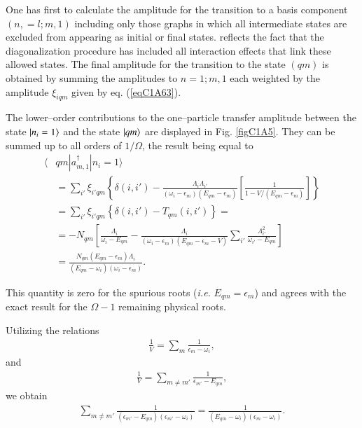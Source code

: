 One has first to calculate the amplitude for the transition to a basis component $(n, = l; m, 1)$ including only those graphs in which all intermediate states are excluded from appearing as initial or final states. reflects the fact that the diagonalization procedure has included all interaction effects that link these allowed states. The final amplitude for the transition to the state $(qm)$ is obtained by summing the amplitudes to $n=1;m,1$ each weighted by the amplitude $\xi_{iqm}$ given by eq. (\ref{eqC1A63}). 

The lower--order contributions to the one--particle transfer amplitude between the state $|{n_i=1} \rangle$ and the state $|{qm} \rangle$ are displayed in Fig. \ref{figC1A5}. They can be summed up to all orders of $1/\Omega$, the result being equal to 
  \begin{align}\label{eqC1A73} 
   \nonumber \langle & qm|a^\dagger_{m,1}|n_i=1\rangle\\
\nonumber &=\sum_{i'}\xi_{i'qm}\left\{\delta(i,i')-\frac{\Lambda_i\Lambda_{i'}}{(\omega_i-\epsilon_m)(E_{qm}-\epsilon_m)}\left[\frac{1}{1-V/(E_{qm}-\epsilon_m)}\right]\right\}\\
\nonumber &=\sum_{i'}\xi_{i'qm}\left\{\delta(i,i')-T_{qm}(i,i')\right\}=\\
\nonumber & =-N_{qm}\left[\frac{\Lambda_i}{\omega_i-E_{qm}}-\frac{\Lambda_i}{(\omega_i-\epsilon_m)(E_{qm}-\epsilon_m-V)}\sum_{i'}\frac{\Lambda_{i'}^2}{\omega_{i'}-E_{qm}}\right]\\
&=\frac{N_{qm}(E_{qm}-\epsilon_m)\Lambda_i}{(E_{qm}-\omega_i)(\omega_i-\epsilon_m)}.
\end{align} 


This quantity is zero for the spurious roots (\textit{i.e.} $E_{qm}=\epsilon_m$) and agrees with the exact result for the $\Omega-1$ remaining physical roots. 


Utilizing the relations
  \begin{align}\label{eqC1A74} 
  \frac{1}{V}=\sum_m\frac{1}{\epsilon_m-\omega_i},
    \end{align}  
and  
  \begin{align}\label{eqC1A75} 
   \frac{1}{V}=\sum_{m\neq m'}\frac{1}{\epsilon_{m'}-E_{qm}},
    \end{align} 
we  obtain  
  \begin{align}\label{eqC1A76} 
   \sum_{m\neq m'}\frac{1}{(\epsilon_{m'}-E_{qm})(\epsilon_{m'}-\omega_i)}=\frac{1}{(E_{qm}-\omega_i)(\epsilon_m-\omega_i)}.
    \end{align} 

